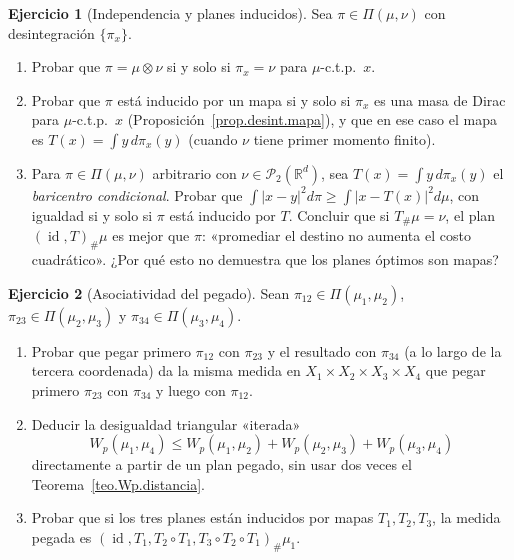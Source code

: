 \documentclass[12pt, a4paper]{amsbook}
\newcommand{\id}{\operatorname{id}}
\newcommand{\R}{{\mathbb R}}
\theoremstyle{remark}
\theoremstyle{definition}
\newtheorem{ejercicio}{Ejercicio}[chapter]
\numberwithin{section}{chapter}
\numberwithin{subsection}{section}
\numberwithin{equation}{section}
\numberwithin{figure}{chapter}
\begin{document}
\begin{ejercicio}[Independencia y planes inducidos]\label{ejer.desint.independencia}
Sea $\pi\in\Pi(\mu,\nu)$ con desintegración $\{\pi_x\}$.
\begin{enumerate}[label=(\alph*)]
\item Probar que $\pi=\mu\otimes\nu$ si y solo si $\pi_x=\nu$ para
$\mu$-c.t.p.\ $x$.
\item Probar que $\pi$ está inducido por un mapa si y solo si $\pi_x$ es una
masa de Dirac para $\mu$-c.t.p.\ $x$ (Proposición~\ref{prop.desint.mapa}), y
que en ese caso el mapa es $T(x)=\int y\,d\pi_x(y)$ (cuando $\nu$ tiene
primer momento finito).
\item Para $\pi\in\Pi(\mu,\nu)$ arbitrario con $\nu\in\mathcal P_2(\R^d)$,
sea $T(x)=\int y\,d\pi_x(y)$ el \emph{baricentro condicional}. Probar que
$\int|x-y|^2d\pi\ge\int|x-T(x)|^2d\mu$, con igualdad si y solo si $\pi$ está
inducido por $T$. Concluir que si $T_\#\mu=\nu$, el plan $(\id,T)_\#\mu$ es
mejor que $\pi$: «promediar el destino no aumenta el costo cuadrático».
¿Por qué esto no demuestra que los planes óptimos son mapas?
\end{enumerate}
\end{ejercicio}

\begin{ejercicio}[Asociatividad del pegado]\label{ejer.pegado.asociativo}
Sean $\pi_{12}\in\Pi(\mu_1,\mu_2)$, $\pi_{23}\in\Pi(\mu_2,\mu_3)$ y
$\pi_{34}\in\Pi(\mu_3,\mu_4)$.
\begin{enumerate}[label=(\alph*)]
\item Probar que pegar primero $\pi_{12}$ con $\pi_{23}$ y el resultado con
$\pi_{34}$ (a lo largo de la tercera coordenada) da la misma medida en
$X_1\times X_2\times X_3\times X_4$ que pegar primero $\pi_{23}$ con
$\pi_{34}$ y luego con $\pi_{12}$.
\item Deducir la desigualdad triangular «iterada»
\[
W_p(\mu_1,\mu_4)\le W_p(\mu_1,\mu_2)+W_p(\mu_2,\mu_3)+W_p(\mu_3,\mu_4)
\]
directamente a partir de un plan pegado, sin usar dos veces el
Teorema~\ref{teo.Wp.distancia}.
\item Probar que si los tres planes están inducidos por mapas $T_1,T_2,T_3$,
la medida pegada es $(\id,T_1,T_2\circ T_1,T_3\circ T_2\circ T_1)_\#\mu_1$.
\end{enumerate}
\end{ejercicio}
\end{document}
